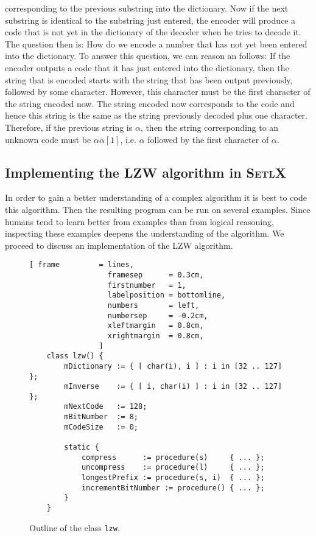 corresponding to the previous substring into the dictionary.  Now if the next substring is identical
to the substring just entered, the encoder will produce a code that is not yet in the dictionary of
the decoder when he tries to decode it.   The question then is: How do we encode a number that has
not yet been entered into the dictionary.  To answer this question, we can reason an follows:
If the encoder outputs a code that it has just entered into the dictionary, then the string that is
encoded starts with the string that has been output previously, followed by some character.  However,
this character must be the first character of the string encoded now.  The string encoded now
corresponds to the code and hence this string is the same as the string previously decoded plus one
character. Therefore, if the previous string is $\alpha$, then the string
corresponding to an unknown code must be $\alpha \alpha[1]$, i.e. $\alpha$ followed by the first
character of $\alpha$.



\subsection{Implementing the LZW algorithm in \textsc{SetlX}}
In order to gain a better understanding of a complex algorithm it is best to code this algorithm.
Then the resulting program can be run on several examples.  Since humans tend
to learn better from examples than from logical reasoning, inspecting these examples deepens
the understanding of the algorithm.  We proceed to discuss an implementation of the LZW
algorithm.  

\begin{figure}[!ht]
\centering
\begin{Verbatim}[ frame         = lines, 
                  framesep      = 0.3cm, 
                  firstnumber   = 1,
                  labelposition = bottomline,
                  numbers       = left,
                  numbersep     = -0.2cm,
                  xleftmargin   = 0.8cm,
                  xrightmargin  = 0.8cm,
                ]
    class lzw() {
        mDictionary := { [ char(i), i ] : i in [32 .. 127] };
        mInverse    := { [ i, char(i) ] : i in [32 .. 127] };
        mNextCode   := 128;
        mBitNumber  := 8;
        mCodeSize   := 0;
    
        static {
            compress      := procedure(s)     { ... };
            uncompress    := procedure(l)     { ... };
            longestPrefix := procedure(s, i)  { ... };
            incrementBitNumber := procedure() { ... };
        }
    }
\end{Verbatim}
\vspace*{-0.3cm}
\caption{Outline of the class \texttt{lzw}.}
\label{fig:lzw.stlx-outline}
\end{figure}


